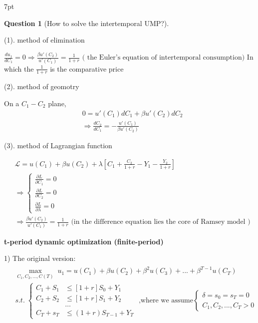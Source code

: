 \documentclass{article}
\newenvironment{redblock}{
\def\FrameCommand{
  \hspace{1pt}
    {\color{LightCoral}
    \vrule width 2pt}
    {\color{redshade}
    \vrule width 4pt}
  \colorbox{redshade}
}
\MakeFramed{
  \advance
  \hsize-
  \width
  \FrameRestore}
\noindent\hspace{-4.55pt}%
\begin{adjustwidth}{}{7pt}
\vspace{2pt}\vspace{2pt}
}
{\vspace{2pt}\end{adjustwidth}\endMakeFramed}
\newtheorem{question}{Question}
\begin{document}
\begin{redblock}
\begin{question}[How to solve the intertemporal UMP?]
\end{question}


(1). method of elimination

$\frac{du_{1}}{dC_{1}}=0 \Rightarrow \frac{\beta u'(C_{2})}{u'(C_{1})}=\frac{1}{1+r} \text{ ( the Euler's equation of intertemporal consumption)}$
In which the $\frac{1}{1+r}$ is the comparative price

(2). method of geomotry 

On a $C_{1}-C_{2}$ plane, \begin{align}
&0=u'(C_{1})dC_{1}+\beta u'(C_{2})dC_{2}
\\&\Rightarrow \frac{dC_{2}}{dC_{1}}=-\frac{u'(C_{1})}{\beta u'(C_{2})}
\end{align}

(3). method of Lagrangian function 

\begin{align}
& \mathscr{L}=u(C_{1})+\beta u(C_{2})+\lambda[C_{1}+\frac{C_{2}}{1+r}-Y_{1}-\frac{Y_{2}}{1+r}]
\\&\Rightarrow  \begin{cases}
\frac{\partial L}{\partial C_{1}}=0 \\
\frac{\partial L }{\partial  C_{2}}=0 \\
\frac{\partial L}{\partial \lambda}=0\end{cases}
\\&\Rightarrow \frac{\beta u'(C_{2})}{u'(C_{1})}=\frac{1}{1+r} \text{ (in the difference equation lies the core of Ramsey model )}
\end{align}
\end{redblock}


\textbf{t-period dynamic optimization (finite-period)} 

1) The original version:
\begin{align}
\begin{split}
&\mathop{max}_{C_{1},C_{2},...,C(T)} \; u_{1}=u(C_{1})+\beta u(C_{2})+\beta^{2}u(C_{3})+...+\beta^{T-1}u(C_{T})
\\&s.t. \; \begin{cases}
C_{1}+S_{1} &\leqslant [1+r]S_{0} +Y_{1} \\
C_{2}+S_{2} &\leqslant [1+r]S_{1}+Y_{2} \\
&\dots\\
C_{T}+s_{T}&\leqslant(1+r)S_{T-1}+Y_{T} \end{cases}\text{ ,where we assume}\begin{cases}
\delta=s_{0}=s_{T}=0 \\
C_{1},C_{2},...,C_{T}>0\end{cases} 
\end{split}
\end{align}
\end{document}
